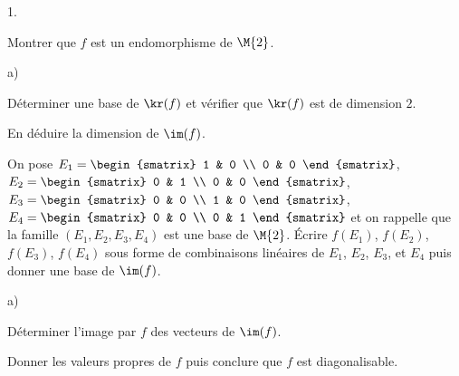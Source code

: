 \begin{noliste}{1.}
  \setlength{\itemsep}{4mm} %
  \setcounter{enumi}{2}
\item Montrer que $f$ est un endomorphisme de $\M{2}$.

  
  



\item 
  \begin{noliste}{a)}
    \setlength{\itemsep}{2mm}
  \item Déterminer une base de $\kr(f)$ et vérifier que $\kr(f)$ est
    de dimension $2$.

    




  \item En déduire la dimension de $\im(f)$.

    

  \item On pose $E_1 =
    \begin{smatrix}
      1 & 0 \\
      0 & 0
    \end{smatrix}
    $, $E_2 =
    \begin{smatrix}
      0 & 1 \\
      0 & 0
    \end{smatrix}
    $, $E_3 =
    \begin{smatrix}
      0 & 0 \\
      1 & 0
    \end{smatrix}
    $, $E_4 =
    \begin{smatrix}
      0 & 0 \\
      0 & 1
    \end{smatrix}
    $ et on rappelle que la famille $(E_1, E_2, E_3, E_4)$ est une
    base de $\M{2}$. Écrire $f(E_1)$, $f(E_2)$, $f(E_3)$, $f(E_4)$
    sous forme de combinaisons linéaires de $E_1$, $E_2$, $E_3$, et
    $E_4$ puis donner une base de $\im(f)$.
    
  \end{noliste}

\item 
  \begin{noliste}{a)}
    \setlength{\itemsep}{2mm}
  \item Déterminer l'image par $f$ des vecteurs de $\im(f)$.

    

  \item Donner les valeurs propres de $f$ puis conclure que $f$ est
    diagonalisable.


\end{noliste}
\end{noliste}
